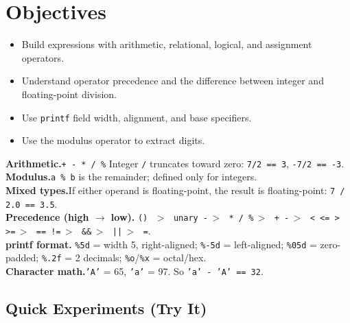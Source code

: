 \documentclass[11pt]{article}
\begin{document}
\labheader

\section*{Objectives}
\begin{itemize}[leftmargin=*,nosep]
  \item Build expressions with arithmetic, relational, logical, and assignment operators.
  \item Understand operator precedence and the difference between integer and floating-point division.
  \item Use \texttt{printf} field width, alignment, and base specifiers.
  \item Use the modulus operator to extract digits.
\end{itemize}

\begin{summary}
\textbf{Arithmetic.}\quad \texttt{+ - * / \%}\quad
Integer \texttt{/} truncates toward zero: \texttt{7/2 == 3}, \texttt{-7/2 == -3}.\\
\textbf{Modulus.}\quad \texttt{a \% b} is the remainder; defined only for integers.\\
\textbf{Mixed types.}\quad If either operand is floating-point, the result is floating-point:
\texttt{7 / 2.0 == 3.5}.\\
\textbf{Precedence (high $\to$ low).}\quad
\texttt{() }$\,>\,$\texttt{ unary -}$\,>\,$\texttt{ * / \%}$\,>\,$\texttt{ + -}$\,>\,$\texttt{ < <= > >=}$\,>\,$\texttt{ == !=}$\,>\,$\texttt{ \&\&}$\,>\,$\texttt{ ||}$\,>\,$\texttt{ =}.\\
\textbf{printf format.}\quad
\texttt{\%5d} = width 5, right-aligned; \texttt{\%-5d} = left-aligned; \texttt{\%05d} = zero-padded;
\texttt{\%.2f} = 2 decimals; \texttt{\%o}/\texttt{\%x} = octal/hex.\\
\textbf{Character math.}\quad \texttt{'A'} = 65, \texttt{'a'} = 97. So \texttt{'a' - 'A' == 32}.
\end{summary}

\subsection*{Quick Experiments (Try It)}
\end{document}
